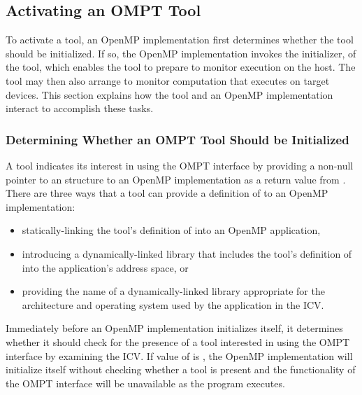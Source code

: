 \subsection{Activating an OMPT Tool}
\label{sec:ompt-initialization}

To activate a tool, an OpenMP implementation first determines whether 
the tool should be initialized. If so, the OpenMP implementation invokes 
the initializer, of the tool, which enables the tool to prepare to monitor 
execution on the host. The tool may then also arrange to monitor computation 
that executes on target devices. This section explains how the tool and an
OpenMP implementation interact to accomplish these tasks.



\subsubsection{Determining Whether an OMPT Tool Should be Initialized}
\label{sec:ompt-check-tool}

A tool indicates its interest in using the OMPT interface
by providing a non-null pointer to an
structure to an OpenMP implementation as a return value from
. There are three ways
that a tool can provide a definition of  to an
OpenMP implementation:

\begin{itemize}
\item statically-linking the tool's definition of 
  into an OpenMP application,
\item introducing a dynamically-linked library that includes the tool's definition
  of  into the application's address space, or
\item providing the name of a dynamically-linked library appropriate
  for the architecture and operating system used by the application
  in the  ICV.
\end{itemize}

Immediately before an OpenMP implementation initializes itself, it
determines whether it should check for the presence of a tool
interested in using the OMPT interface by examining the 
ICV.  If value of  is , the OpenMP
implementation will initialize itself without checking whether a
tool is present and the functionality of the OMPT interface will be
unavailable as the program executes.

